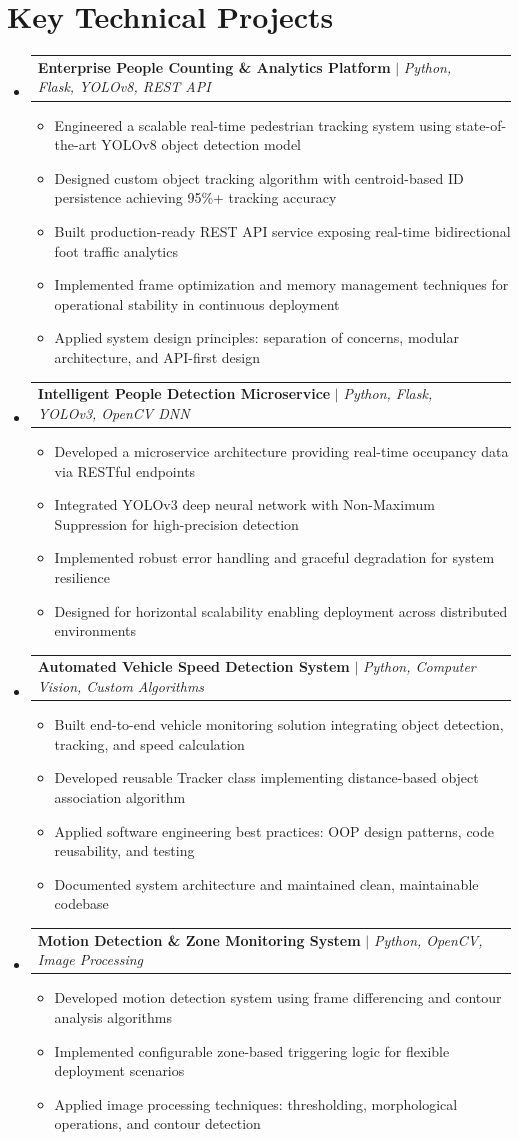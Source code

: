 \documentclass[letterpaper,11pt]{article}
\makeatletter
\newcommand{\resumeItem}[1]{
  \item\small{
    {#1 \vspace{-2pt}}
  }
}
\newcommand{\resumeProjectHeading}[2]{
    \item
    \begin{tabular*}{0.97\textwidth}{l@{\extracolsep{\fill}}r}
      \small#1 & #2 \\
    \end{tabular*}\vspace{-7pt}
}
\newcommand{\resumeSubHeadingListStart}{\begin{itemize}[leftmargin=0.15in, label={}]}
\newcommand{\resumeSubHeadingListEnd}{\end{itemize}}
\newcommand{\resumeItemListStart}{\begin{itemize}}
\newcommand{\resumeItemListEnd}{\end{itemize}\vspace{-5pt}}
\makeatother
\begin{document}
\section{Key Technical Projects}
    \resumeSubHeadingListStart
      \resumeProjectHeading
          {\textbf{Enterprise People Counting \& Analytics Platform} $|$ \emph{Python, Flask, YOLOv8, REST API}}{}
          \resumeItemListStart
            \resumeItem{Engineered a scalable real-time pedestrian tracking system using state-of-the-art YOLOv8 object detection model}
            \resumeItem{Designed custom object tracking algorithm with centroid-based ID persistence achieving 95\%+ tracking accuracy}
            \resumeItem{Built production-ready REST API service exposing real-time bidirectional foot traffic analytics}
            \resumeItem{Implemented frame optimization and memory management techniques for operational stability in continuous deployment}
            \resumeItem{Applied system design principles: separation of concerns, modular architecture, and API-first design}
          \resumeItemListEnd
      \resumeProjectHeading
          {\textbf{Intelligent People Detection Microservice} $|$ \emph{Python, Flask, YOLOv3, OpenCV DNN}}{}
          \resumeItemListStart
            \resumeItem{Developed a microservice architecture providing real-time occupancy data via RESTful endpoints}
            \resumeItem{Integrated YOLOv3 deep neural network with Non-Maximum Suppression for high-precision detection}
            \resumeItem{Implemented robust error handling and graceful degradation for system resilience}
            \resumeItem{Designed for horizontal scalability enabling deployment across distributed environments}
          \resumeItemListEnd
      \resumeProjectHeading
          {\textbf{Automated Vehicle Speed Detection System} $|$ \emph{Python, Computer Vision, Custom Algorithms}}{}
          \resumeItemListStart
            \resumeItem{Built end-to-end vehicle monitoring solution integrating object detection, tracking, and speed calculation}
            \resumeItem{Developed reusable Tracker class implementing distance-based object association algorithm}
            \resumeItem{Applied software engineering best practices: OOP design patterns, code reusability, and testing}
            \resumeItem{Documented system architecture and maintained clean, maintainable codebase}
          \resumeItemListEnd
      \resumeProjectHeading
          {\textbf{Motion Detection \& Zone Monitoring System} $|$ \emph{Python, OpenCV, Image Processing}}{}
          \resumeItemListStart
            \resumeItem{Developed motion detection system using frame differencing and contour analysis algorithms}
            \resumeItem{Implemented configurable zone-based triggering logic for flexible deployment scenarios}
            \resumeItem{Applied image processing techniques: thresholding, morphological operations, and contour detection}
          \resumeItemListEnd
    \resumeSubHeadingListEnd
\end{document}
